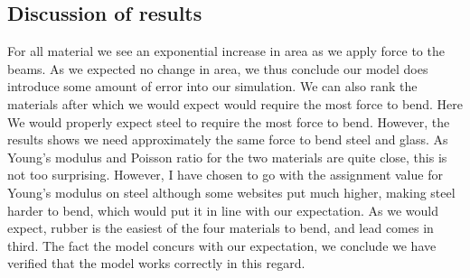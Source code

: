 \subsection{Discussion of results}
For all material we see an exponential increase in area as we apply force to the beams. As we expected no change in area, we thus conclude our model does introduce some amount of error into our simulation. We can also rank the materials after which we would expect would require the most force to bend. Here We would properly expect steel to require the most force to bend. However, the results shows we need approximately the same force to bend steel and glass. As Young's modulus and Poisson ratio for the two materials are quite close, this is not too surprising. However, I have chosen to go with the assignment value for Young's modulus on steel although some websites put much higher, making steel harder to bend, which would put it in line with our expectation. As we would expect, rubber is the easiest of the four materials to bend, and lead comes in third. The fact the model concurs with our expectation, we conclude we have verified that the model works correctly in this regard.